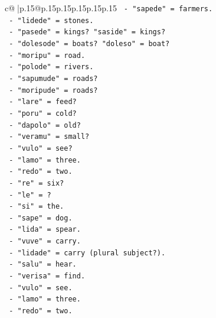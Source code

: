 \documentclass{article}
\begin{document}
{\begin{supertabular}{c@{$\;$}|p{.15\linewidth}@{}p{.15\linewidth}p{.15\linewidth}p{.15\linewidth}p{.15\linewidth}p{.15\linewidth}}
{{{\texttt{                        {-} "sapede" = farmers.} \\
\texttt{                        {-} "lidede" = stones.} \\
\texttt{                        {-} "pasede" = kings? "saside" = kings?} \\
\texttt{                        {-} "dolesode" = boats? "doleso" = boat?} \\
\texttt{                        {-} "moripu" = road.} \\
\texttt{                        {-} "polode" = rivers.} \\
\texttt{                        {-} "sapumude" = roads?} \\
\texttt{                        {-} "moripude" = roads?} \\
\texttt{                        {-} "lare" = feed?} \\
\texttt{                        {-} "poru" = cold?} \\
\texttt{                        {-} "dapolo" = old?} \\
\texttt{                        {-} "veramu" = small?} \\
\texttt{                        {-} "vulo" = see?} \\
\texttt{                        {-} "lamo" = three.} \\
\texttt{                        {-} "redo" = two.} \\
\texttt{                        {-} "re" = six?} \\
\texttt{                        {-} "le" = ?} \\
\texttt{                        {-} "si" = the.} \\
\texttt{                        {-} "sape" = dog.} \\
\texttt{                        {-} "lida" = spear.} \\
\texttt{                        {-} "vuve" = carry.} \\
\texttt{                        {-} "lidade" = carry (plural subject?).} \\
\texttt{                        {-} "salu" = hear.} \\
\texttt{                        {-} "verisa" = find.} \\
\texttt{                        {-} "vulo" = see.} \\
\texttt{                        {-} "lamo" = three.} \\
\texttt{                        {-} "redo" = two.} \\
}}}
\end{supertabular}}
\end{document}
